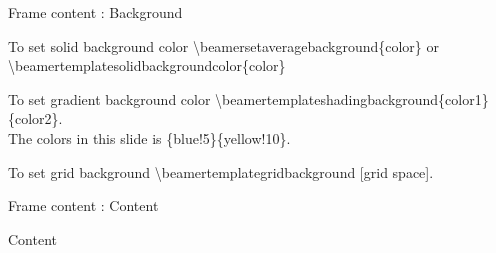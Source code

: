 \documentclass[10pt,blue,xcolor=pdftex,dvipsnames,table,handout]{beamer}
\begin{document}
		\begin{frame}[t]{Frame content : Background}


			\begin{block} {To set solid background color}
			\textbackslash beamersetaveragebackground\{color\} or\\
			\textbackslash beamertemplatesolidbackgroundcolor\{color\}
			\end{block}


			\begin{block} {To set gradient background color}
			\textbackslash beamertemplateshadingbackground\{color1\}\{color2\}.\\
			The colors in this slide is \{blue!5\}\{yellow!10\}.
			\end{block}


			\begin{block} {To set grid background}
			\textbackslash beamertemplategridbackground [grid space].
			\end{block}


		\end{frame}


		\begin{frame}{Frame content : Content}

			\begin{block} {Content}
			\end{block}

		\end{frame}


		\begin{frame}[plain]
		\end{frame}
\end{document}
